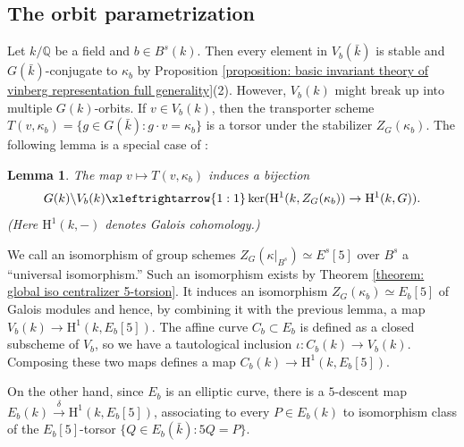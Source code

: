 \documentclass{article} %
\newtheorem{lemma}[proposition]{Lemma}
\numberwithin{equation}{section}
\theoremstyle{definition}
\newcommand{\HH}{\mathrm{H}}
\newcommand{\Q}{\mathbb{Q}}
\begin{document}
\subsection{The orbit parametrization}


Let $k/\Q$ be a field and $b\in B^s(k)$.
Then every element in $V_b(\bar{k})$ is stable and $G(\bar{k})$-conjugate to $\kappa_b$ by Proposition \ref{proposition: basic invariant theory of vinberg representation full generality}(2).
However, $V_b(k)$ might break up into multiple $G(k)$-orbits.
If $v\in V_b(k)$, then the transporter scheme $T(v,\kappa_b) = \{g\in G(\bar{k}) \colon g\cdot v = \kappa_b\}$ is a torsor under the stabilizer $Z_G(\kappa_b)$. 
The following lemma is a special case of \cite[Proposition 1]{BhargavaGross-AIT}:

\begin{lemma}\label{lemma: AIT bhargava gross}
    The map $v\mapsto T(v, \kappa_b)$ induces a bijection 
    \begin{align*}
    G(k) \backslash V_b(k) \xleftrightarrow{1:1} \ker(\HH^1(k,Z_{G}(\kappa_b))\rightarrow \HH^1(k,G)).
    \end{align*}
    (Here $\HH^1(k,-)$ denotes Galois cohomology.)
\end{lemma}


We call an isomorphism of group schemes $Z_G(\kappa|_{B^s})\simeq E^s[5]$ over $B^s$ a ``universal isomorphism.'' 
Such an isomorphism exists by Theorem \ref{theorem: global iso centralizer 5-torsion}.
It induces an isomorphism $Z_G(\kappa_b)\simeq E_b[5]$ of Galois modules and hence, by combining it with the previous lemma, a map $V_b(k)\rightarrow \HH^1(k, E_b[5])$.
The affine curve $C_b\subset E_b$ is defined as a closed subscheme of $V_b$, so we have a tautological inclusion $\iota\colon C_b(k) \rightarrow V_b(k)$.
Composing these two maps defines a map $C_b(k) \rightarrow \HH^1(k,E_b[5])$. 

On the other hand, since $E_b$ is an elliptic curve, there is a $5$-descent map $E_b(k) \xrightarrow{\delta} \HH^1(k, E_b[5])$, associating to every $P\in E_b(k)$ to isomorphism class of the $E_b[5]$-torsor $\{Q\in E_b(\bar{k})\colon 5Q = P\}$.
\end{document}
